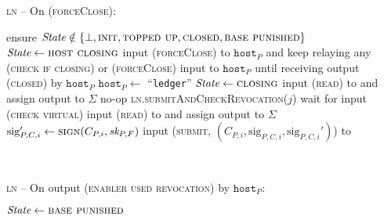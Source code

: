 \begin{center}
  \begin{processbox}{\textsc{ln} -- On (\textsc{forceClose}):}
    \begin{algorithmic}[1]
      \State ensure $\itistate \notin \{\bot, \textsc{init}, \textsc{topped up},
      \textsc{closed}, \textsc{base punished}\}$ 
       
        \State $\itistate \gets \textsc{host closing}$
        \State input (\textsc{forceClose}) to $\texttt{host}_P$ and keep relaying any
        (\textsc{check if closing}) or (\textsc{forceClose}) input to
        $\texttt{host}_P$ until receiving output (\textsc{closed}) by
        $\texttt{host}_P$
        \label{code:ln:close:relay}
        \State $\texttt{host}_P \gets$ ``\texttt{ledger}''
      \EndIf
      \State $\itistate \gets \textsc{closing}$
      \State input (\textsc{read}) to \ledger and assign output to $\Sigma$
       
        \State no-op 
        \State \textsc{ln}.\textsc{submitAndCheckRevocation}($j$)
      \Else \: 
         
          \State wait for input (\textsc{check virtual}) 
          \State input (\textsc{read}) to \ledger and assign output to $\Sigma$
        \EndWhile
        \State $\mathrm{sig}_{P, C, i}' \gets \textsc{sign}(C_{P, i}, \textit{sk}_{P,
        F})$
        \State input (\textsc{submit}, $(C_{P, i}, \mathrm{sig}_{P, C, i},
        \mathrm{sig}_{P, C, i}')$) to \ledger
        \label{code:ln:close:submit}
      \EndIf
    \end{algorithmic}
  \end{processbox}
  \label{code:ln:close}
\end{center} \ \\

\begin{center}
  \begin{processbox}{\textsc{ln} -- On output (\textsc{enabler used revocation})
  by $\texttt{host}_P$:}
    \begin{algorithmic}[1]
      \State $\itistate \gets \textsc{base punished}$
    \end{algorithmic}
  \end{processbox}
  \label{code:ln:used-revocation}
\end{center} \ \\

